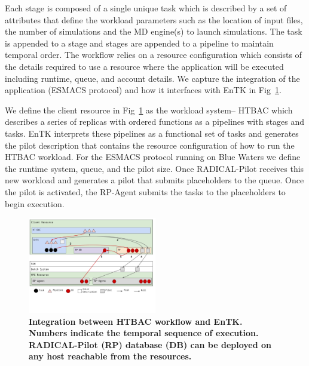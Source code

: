 
Each stage is composed of a single unique task which is described by a set of attributes that define the workload parameters such as the location of input files, the number of simulations and the MD engine(s) to launch simulations. The task is appended to a stage and stages are appended to a pipeline to maintain temporal order. The workflow relies on a resource configuration which consists of the details required to use a resource where the application will be executed including runtime, queue, and account details. We capture the integration of the application (ESMACS protocol) and how it interfaces with EnTK in Fig~\ref{figure:ht-bac_rp}. 

We define the client resource in Fig~\ref{figure:ht-bac_rp} as the workload system-- HTBAC which describes a series of replicas with ordered functions as a pipelines with stages and tasks. EnTK interprets these pipelines as a functional set of tasks and generates the pilot description that contains the resource configuration of how to run the HTBAC workload. For the ESMACS protocol running on Blue Waters we define the runtime system, queue, and the pilot size. Once RADICAL-Pilot receives this new workload and generates a pilot that submits placeholders to the queue. Once the pilot is activated, the RP-Agent submits the tasks to the placeholders to begin execution.  


\begin{figure}[ht]
\centering
  \includegraphics[width=0.5\textwidth]{FIGURES/ht-bac-rp_integration.pdf}
  \caption{\bf Integration between HTBAC workflow and EnTK. Numbers indicate the temporal sequence of execution. RADICAL-Pilot (RP) database (DB) can be deployed on any host reachable from the resources.}
   \label{figure:ht-bac_rp}
\end{figure}


